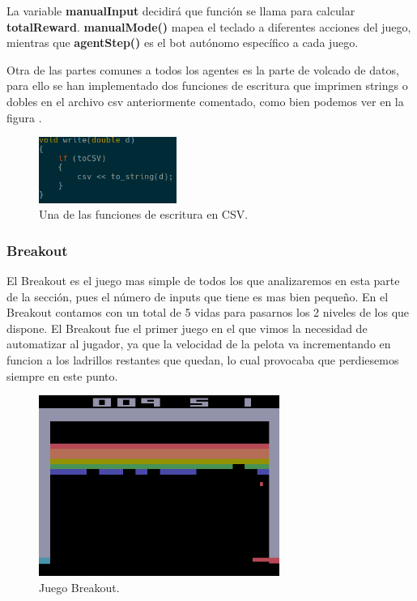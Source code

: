 La variable \textbf{manualInput} decidirá que función se llama para calcular \textbf{totalReward}. \textbf{manualMode()} mapea el teclado a diferentes acciones del juego, mientras que \textbf{agentStep()} es el bot autónomo específico a cada juego.

Otra de las partes comunes a todos los agentes es la parte de volcado de datos, para ello se han implementado dos funciones de escritura que imprimen strings o dobles en el archivo \ac{csv} anteriormente comentado, como bien podemos ver en la figura .

\begin{figure}[h]
	\centering
	\includegraphics[width=0.4\textwidth]{Figures/aledumpcsv}
	\caption{Una de las funciones de escritura en CSV.}
	\label{fig:aledumpcsv}
\end{figure}


\subsubsection{Breakout}
\label{subsec:botsbasicos:breakout}
El Breakout es el juego mas simple de todos los que analizaremos en esta parte de la sección, pues el número de inputs que tiene es mas bien pequeño. En el Breakout contamos con un total de 5 vidas para pasarnos los 2 niveles de los que dispone. El Breakout fue el primer juego en el que vimos la necesidad de automatizar al jugador, ya que la velocidad de la pelota va incrementando en funcion a los ladrillos restantes que quedan, lo cual provocaba que perdiesemos siempre en este punto.

\begin{figure}[h]
	\centering
	\includegraphics[width=0.7\textwidth]{Figures/breakoutgame}
	\caption{Juego Breakout.}
	\label{fig:breakoutgame}
\end{figure}

